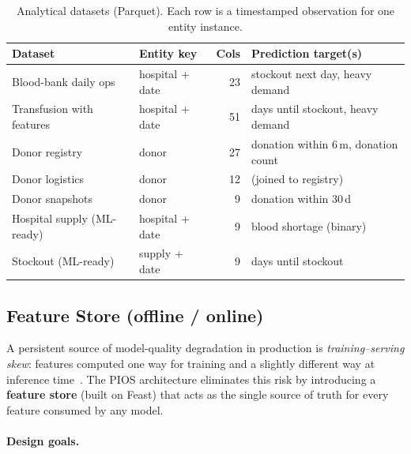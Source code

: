 \begin{table}[htbp]
\centering
\caption{Analytical datasets (Parquet).  Each row is a timestamped
         observation for one entity instance.}
\label{tab:datasets-summary}
\small
\begin{tabular}{@{}llrl@{}}
\toprule
\textbf{Dataset} & \textbf{Entity key}
    & \textbf{Cols} & \textbf{Prediction target(s)} \\
\midrule
Blood-bank daily ops
    & hospital + date & 23
    & stockout next day, heavy demand \\
Transfusion with features
    & hospital + date & 51
    & days until stockout, heavy demand \\
Donor registry
    & donor            & 27
    & donation within 6\,m, donation count \\
Donor logistics
    & donor            & 12
    & (joined to registry) \\
Donor snapshots
    & donor            & 9
    & donation within 30\,d \\
Hospital supply (ML-ready)
    & hospital + date  & 9
    & blood shortage (binary) \\
Stockout (ML-ready)
    & supply + date    & 9
    & days until stockout \\
\bottomrule
\end{tabular}
\end{table}



\subsection{Feature Store (offline / online)}
\label{sec:feature-store}

A persistent source of model-quality degradation in production is
\emph{training--serving skew}: features computed one way for training and a
slightly different way at inference time~\cite{sculley2015hidden}.  The
PIOS architecture eliminates this risk by introducing a \textbf{feature
store} (built on Feast) that acts as the single source of truth for every
feature consumed by any model.

\paragraph{Design goals.}


